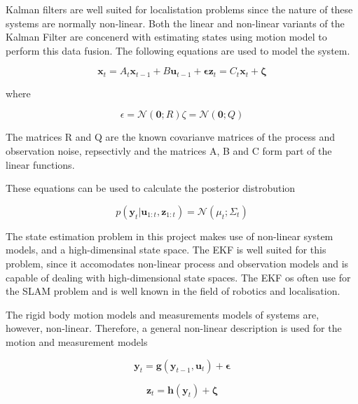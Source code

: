 

Kalman filters are well suited for localistation problems since the nature of these systems are normally non-linear. Both the linear and non-linear variants of the Kalman Filter
are concenerd with estimating states using motion model to perform this data fusion. The following equations are used to model the system.

\begin{equation}
    \mathbf{x}_t = A_t\mathbf{x}_{t-1} + B\mathbf{u}_{t-1} + \mathbf{\epsilon}
    \mathbf{z}_t = C_t\mathbf{x}_t + \mathbf{\zeta}
\end{equation}

where

\begin{equation}
    \epsilon = \mathcal{N}(\mathbf{0};R)
    \zeta = \mathcal{N}(\mathbf{0};Q)
\end{equation}

The matrices R and Q are the known covarianve matrices of the process and observation noise, repsectivly and the matrices A, B and C form part of the linear functions.

These equations can be used to calculate the posterior distrobution

\begin{equation}
    p(\mathbf{y}_t|\mathbf{u}_{1:t},\mathbf{z}_{1:t}) = \mathcal{N}(\mu_t ;\Sigma_t)
\end{equation}

The state estimation problem in this project makes use of non-linear system models, and a high-dimensinal state space. The EKF is well suited for this problem, since it
accomodates non-linear process and observation models and is capable of dealing with high-dimensional state spaces. The EKF os often use for the SLAM problem and is well
known in the field of robotics and localisation.

The rigid body motion models and measurements models of systems are, however, non-linear. Therefore, a general non-linear description is used for the motion and measurement models

\begin{equation}
    \mathbf{y}_t = \mathbf{g}(\mathbf{y}_{t-1},\mathbf{u}_t) + \boldsymbol{\epsilon}
\end{equation}

\begin{equation}
    \mathbf{z}_t = \mathbf{h}(\mathbf{y}_t) + \boldsymbol{\zeta}     
\end{equation}

